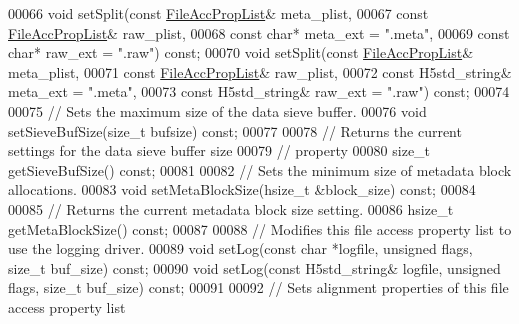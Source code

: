 \begin{DoxyCode}
00066         \textcolor{keywordtype}{void} setSplit(\textcolor{keyword}{const} \hyperlink{class_h5_1_1_file_acc_prop_list}{FileAccPropList}& meta\_plist,
00067                       \textcolor{keyword}{const} \hyperlink{class_h5_1_1_file_acc_prop_list}{FileAccPropList}& raw\_plist,
00068                       \textcolor{keyword}{const} \textcolor{keywordtype}{char}* meta\_ext = \textcolor{stringliteral}{".meta"},
00069                       \textcolor{keyword}{const} \textcolor{keywordtype}{char}* raw\_ext = \textcolor{stringliteral}{".raw"}) \textcolor{keyword}{const};
00070         \textcolor{keywordtype}{void} setSplit(\textcolor{keyword}{const} \hyperlink{class_h5_1_1_file_acc_prop_list}{FileAccPropList}& meta\_plist,
00071                       \textcolor{keyword}{const} \hyperlink{class_h5_1_1_file_acc_prop_list}{FileAccPropList}& raw\_plist,
00072                       \textcolor{keyword}{const} H5std\_string& meta\_ext = \textcolor{stringliteral}{".meta"},
00073                       \textcolor{keyword}{const} H5std\_string& raw\_ext = \textcolor{stringliteral}{".raw"}) \textcolor{keyword}{const};
00074 
00075         \textcolor{comment}{// Sets the maximum size of the data sieve buffer.}
00076         \textcolor{keywordtype}{void} setSieveBufSize(\textcolor{keywordtype}{size\_t} bufsize) \textcolor{keyword}{const};
00077 
00078         \textcolor{comment}{// Returns the current settings for the data sieve buffer size}
00079         \textcolor{comment}{// property}
00080         \textcolor{keywordtype}{size\_t} getSieveBufSize() \textcolor{keyword}{const};
00081 
00082         \textcolor{comment}{// Sets the minimum size of metadata block allocations.}
00083         \textcolor{keywordtype}{void} setMetaBlockSize(hsize\_t &block\_size) \textcolor{keyword}{const};
00084 
00085         \textcolor{comment}{// Returns the current metadata block size setting.}
00086         hsize\_t getMetaBlockSize() \textcolor{keyword}{const};
00087 
00088         \textcolor{comment}{// Modifies this file access property list to use the logging driver.}
00089         \textcolor{keywordtype}{void} setLog(\textcolor{keyword}{const} \textcolor{keywordtype}{char} *logfile, \textcolor{keywordtype}{unsigned} flags, \textcolor{keywordtype}{size\_t} buf\_size) \textcolor{keyword}{const};
00090         \textcolor{keywordtype}{void} setLog(\textcolor{keyword}{const} H5std\_string& logfile, \textcolor{keywordtype}{unsigned} flags, \textcolor{keywordtype}{size\_t} buf\_size) \textcolor{keyword}{const};
00091 
00092         \textcolor{comment}{// Sets alignment properties of this file access property list}

\end{DoxyCode}
